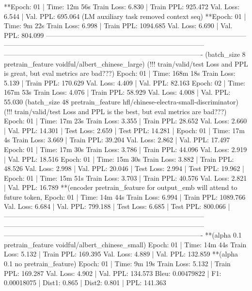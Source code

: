 \documentclass[letterpaper]{article} %
\begin{document}
\begin{CJK*}{UTF8}{gbsn}
**Epoch: 01 | Time: 12m 56s
	Train Loss: 6.830 | Train PPL: 925.472
	 Val. Loss: 6.544 |  Val. PPL: 695.064
(LM auxiliary task removed context seq)
**Epoch: 01 | Time: 9m 22s
	Train Loss: 6.998 | Train PPL: 1094.685
	 Val. Loss: 6.690 |  Val. PPL: 804.099
-----------------------------------------------------------------------------------------
-----------------------------------------------------------------------------------------
----------------------------------------------------------------------------------------
(batch_size 8 pretrain_feature voidful/albert_chinese_large)
(!!! train/valid/test Loss and PPL is great, but eval metrics are bad???)
Epoch: 01 | Time: 168m 18s
	Train Loss: 5.139 | Train PPL: 170.629
	 Val. Loss: 4.409 |  Val. PPL:  82.163
Epoch: 02 | Time: 167m 53s
	Train Loss: 4.076 | Train PPL:  58.929
	 Val. Loss: 4.008 |  Val. PPL:  55.030
(batch_size 48 pretrain_feature hfl/chinese-electra-small-discriminator)
(!!! train/valid/test Loss and PPL is the best, but eval metrics are bad???)
Epoch: 01 | Time: 17m 23s
	Train Loss: 3.355 | Train PPL:  28.652
	 Val. Loss: 2.660 |  Val. PPL:  14.301
| Test Loss: 2.659 | Test PPL:  14.281 |
Epoch: 01 | Time: 17m 4s %
	Train Loss: 3.669 | Train PPL:  39.204
	 Val. Loss: 2.862 |  Val. PPL:  17.497
Epoch: 01 | Time: 17m 30s %
	Train Loss: 3.786 | Train PPL:  44.096
	 Val. Loss: 2.919 |  Val. PPL:  18.516
Epoch: 01 | Time: 15m 30s %
	Train Loss: 3.882 | Train PPL:  48.526
	 Val. Loss: 2.998 |  Val. PPL:  20.046
| Test Loss: 2.994 | Test PPL:  19.962 |
Epoch: 01 | Time: 15m 51s %
	Train Loss: 3.703 | Train PPL:  40.576
	 Val. Loss: 2.821 |  Val. PPL:  16.789
**(encoder pretrain_feature for output_emb will attend to future token, %
Epoch: 01 | Time: 14m 44s
	Train Loss: 6.994 | Train PPL: 1089.766
	 Val. Loss: 6.684 |  Val. PPL: 799.188
| Test Loss: 6.685 | Test PPL: 800.066 |
-----------------------------------------------------------------------------------------
-----------------------------------------------------------------------------------------
----------------------------------------------------------------------------------------
**(alpha 0.1 pretrain_feature voidful/albert_chinese_small)
Epoch: 01 | Time: 14m 44s
	Train Loss: 5.132 | Train PPL: 169.395
	 Val. Loss: 4.889 |  Val. PPL: 132.859
**(alpha 0.1 no pretrain_feature)
Epoch: 01 | Time: 9m 19s
	Train Loss: 5.132 | Train PPL: 169.287
	 Val. Loss: 4.902 |  Val. PPL: 134.573
Bleu: 0.00479822 | F1: 0.00018075 | Dist1: 0.865 | Dist2: 0.801 | PPL: 141.363

\end{CJK*}
\end{document}
